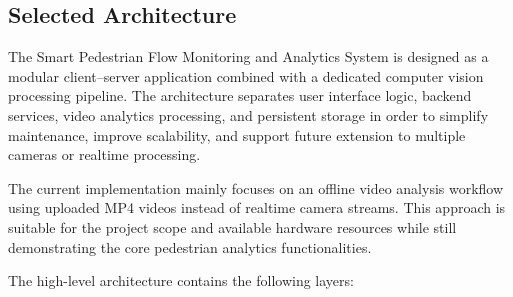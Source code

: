 \documentclass[12pt,a4paper]{report}
\begin{document}
\subsection{Selected Architecture}

The Smart Pedestrian Flow Monitoring and Analytics System is designed as a modular client--server application combined with a dedicated computer vision processing pipeline. The architecture separates user interface logic, backend services, video analytics processing, and persistent storage in order to simplify maintenance, improve scalability, and support future extension to multiple cameras or realtime processing.



The current implementation mainly focuses on an offline video analysis workflow using uploaded MP4 videos instead of realtime camera streams. This approach is suitable for the project scope and available hardware resources while still demonstrating the core pedestrian analytics functionalities.

The high-level architecture contains the following layers:
\end{document}
